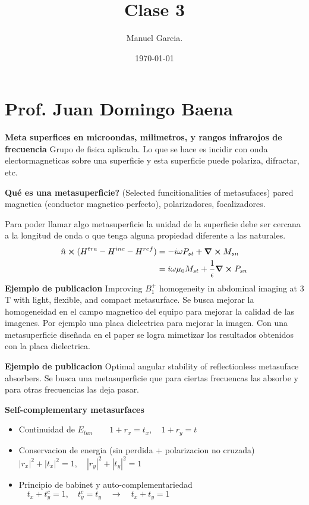 \documentclass{article}
\title{Clase 3 }
\author{Manuel Garcia.}
\date{\today}
\begin{document}
\maketitle

\section{Prof. Juan Domingo Baena}
\textbf{Meta superfices en microondas, milimetros, y rangos infrarojos de frecuencia} Grupo de fisica aplicada. Lo que se hace es incidir con onda electormagneticas sobre una superficie y esta superficie puede polariza, difractar, etc. 

\textbf{Qué es una metasuperficie? } (Selected funcitionalities of metasufaces) pared magnetica (conductor magnetico perfecto), polarizadores, focalizadores. 

Para poder llamar algo metasuperficie la unidad de la superficie debe ser cercana a la longitud de onda o que tenga alguna propiedad diferente a las naturales. 
\begin{align}
  \hat n \cross (H ^ {tra }- H ^ {inc } - H ^ {ref }) &= - i \omega P _{st } + \grad \cross M _{sn }  \\
                                                      &= i \omega \mu _0 M _{st } + \frac{1}{\epsilon }\grad \cross P _{sn }
\end{align}
\textbf{Ejemplo de publicacion } Improving $ B _{1 } ^ {+ } $ homogeneity in abdominal imaging at 3 T with light, flexible, and compact metasurface. Se busca mejorar la homogeneidad en el campo magnetico del equipo para mejorar la calidad de las imagenes. Por ejemplo una placa dielectrica para mejorar la imagen. Con una metasuperficie diseñada en el paper se logra mimetizar los resultados obtenidos con la placa dielectrica.

\textbf{Ejemplo de publicacion }Optimal angular stability of reflectionless metasuface absorbers. Se busca una metasuperficie que para ciertas frecuencas las absorbe y para otras frecuencias las deja pasar. 

\textbf{Self-complementary metasurfaces }
\begin{itemize}
  \item Continuidad de $ E _{tan } \qquad 1 + r _{x } = t _{x } ,\quad 1 + r_y =t  $
  \item Conservacion de energia (sin perdida + polarizacion no cruzada) $ \left|r_x \right|^ {2 } + \left|t_x \right|^2 = 1, \quad \left|r_y \right|^2 + \left|t_y \right|^2 = 1  $
  \item Principio de babinet y auto-complementariedad $ \quad t_x + t_y^c = 1, \quad t_y^c = t_y \quad \rightarrow \quad t_x + t_y = 1 $
\end{itemize}
\end{document}
